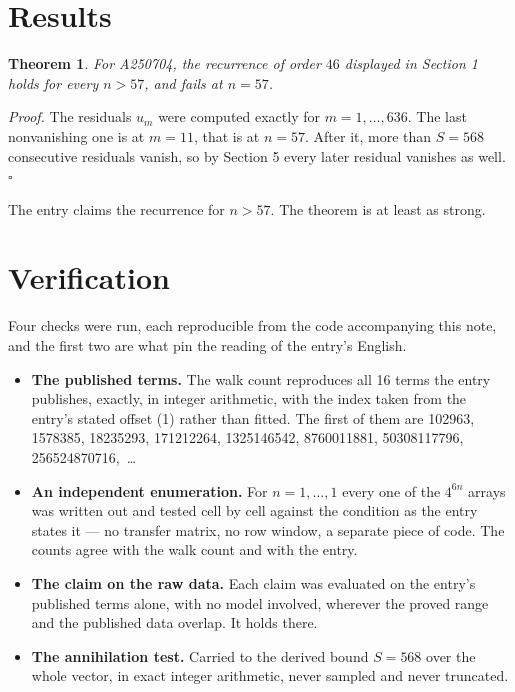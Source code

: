 \documentclass[11pt]{article}
\newtheorem{theorem}{Theorem}
\theoremstyle{definition}
\begin{document}
\section{Results}

\begin{theorem} For A250704, the recurrence of order $46$ displayed in Section 1 holds for every $n > 57$, and fails at $n = 57$.\end{theorem}

{\itshape Proof.} The residuals $u_m$ were computed exactly for $m = 1,\dots,636$. The last nonvanishing one is at $m = 11$, that is at $n = 57$. After it, more than $S = 568$ consecutive residuals vanish, so by Section 5 every later residual vanishes as well. $\square$

The entry claims the recurrence for $n > 57$. The theorem is at least as strong.

\section{Verification}

Four checks were run, each reproducible from the code accompanying this note, and the first two are what pin the reading of the entry's English.

\begin{itemize}

\item {\bfseries The published terms.} The walk count reproduces all 16 terms the entry publishes, exactly, in integer arithmetic, with the index taken from the entry's stated offset (1) rather than fitted. The first of them are 102963, 1578385, 18235293, 171212264, 1325146542, 8760011881, 50308117796, 256524870716,~\dots

\item {\bfseries An independent enumeration.} For $n = 1,\dots,1$ every one of the $4^{6n}$ arrays was written out and tested cell by cell against the condition as the entry states it --- no transfer matrix, no row window, a separate piece of code. The counts agree with the walk count and with the entry.

\item {\bfseries The claim on the raw data.} Each claim was evaluated on the entry's published terms alone, with no model involved, wherever the proved range and the published data overlap. It holds there.

\item {\bfseries The annihilation test.} Carried to the derived bound $S = 568$ over the whole vector, in exact integer arithmetic, never sampled and never truncated.

\end{itemize}
\end{document}
